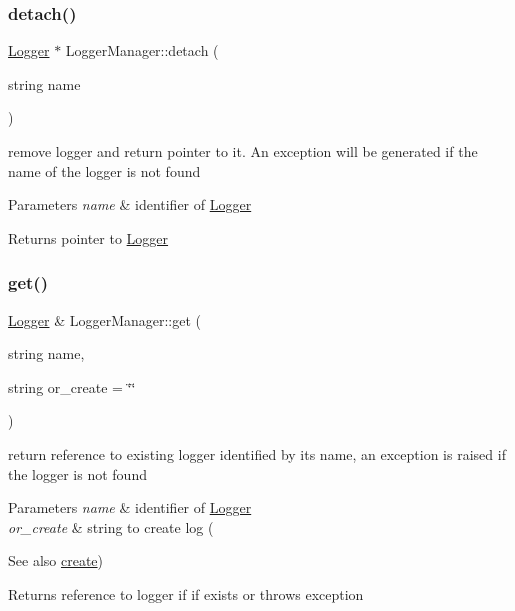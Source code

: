 \subsubsection{\texorpdfstring{detach()}{detach()}}
{\footnotesize\ttfamily \hyperlink{classez_1_1logging_1_1Logger}{Logger} $\ast$ Logger\+Manager\+::detach (\begin{DoxyParamCaption}\item[{string}]{name }\end{DoxyParamCaption})}

remove logger and return pointer to it. An exception will be generated if the name of the logger is not found 
\begin{DoxyParams}{Parameters}
{\em name} & identifier of \hyperlink{classez_1_1logging_1_1Logger}{Logger} \\
\hline
\end{DoxyParams}
\begin{DoxyReturn}{Returns}
pointer to \hyperlink{classez_1_1logging_1_1Logger}{Logger} 
\end{DoxyReturn}
\mbox{\label{classez_1_1logging_1_1LoggerManager_a90c836448bef5099d16d03b37bf52661}} 
\subsubsection{\texorpdfstring{get()}{get()}}
{\footnotesize\ttfamily \hyperlink{classez_1_1logging_1_1Logger}{Logger} \& Logger\+Manager\+::get (\begin{DoxyParamCaption}\item[{string}]{name,  }\item[{string}]{or\+\_\+create = {\ttfamily \char`\"{}\char`\"{}} }\end{DoxyParamCaption})}

return reference to existing logger identified by its name, an exception is raised if the logger is not found 
\begin{DoxyParams}{Parameters}
{\em name} & identifier of \hyperlink{classez_1_1logging_1_1Logger}{Logger} \\
\hline
{\em or\+\_\+create} & string to create log (\\
\hline
\end{DoxyParams}
\begin{DoxySeeAlso}{See also}
\hyperlink{classez_1_1logging_1_1LoggerManager_aba82648266530bd33f74d865c4c55878}{create}) 
\end{DoxySeeAlso}
\begin{DoxyReturn}{Returns}
reference to logger if if exists or throws exception 
\end{DoxyReturn}
\mbox{\label{classez_1_1logging_1_1LoggerManager_a787219c6e31bc575de95127350da7c5a}} 
